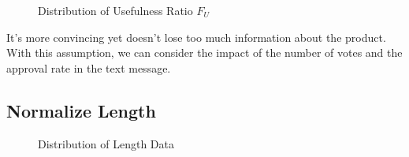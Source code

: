 \documentclass{mcmthesis}
\begin{document}
\begin{figure}[ht]
    \caption{Distribution of Usefulness Ratio $F_U$}
    \label{fig:new_ratio_useful}
\end{figure}


It's more convincing yet doesn't lose too much information about the product. With this assumption, we can consider the impact of the number of votes and the approval rate in the text message.

\subsection{Normalize Length}\label{length}
\begin{figure}[ht]
    \centering
    \caption{Distribution of Length Data}
    \label{fig:length_pic}
\end{figure}
\end{document}

